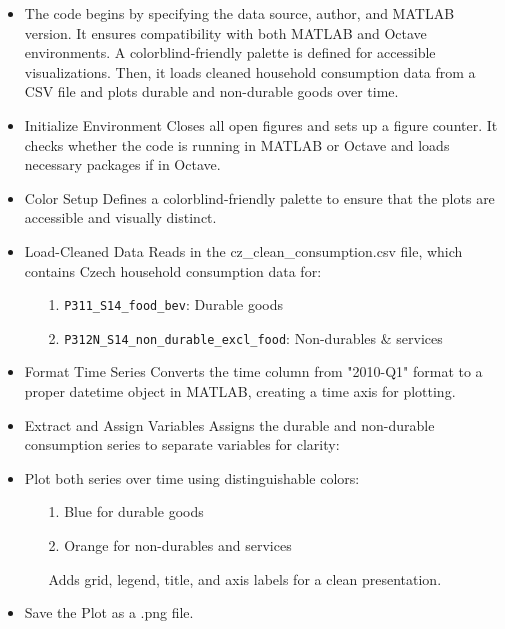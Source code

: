 \documentclass[12pt,a4paper,notitlepage]{article}
\numberwithin{equation}{section}
\begin{document}
\begin{itemize}
    \item The code begins by specifying the data source, author, and MATLAB version. It ensures compatibility with both MATLAB and Octave environments. A colorblind-friendly palette is defined for accessible visualizations. Then, it loads cleaned household consumption data from a CSV file and plots durable and non-durable goods over time.

    \item Initialize Environment Closes all open figures and sets up a figure counter. It checks whether the code is running in MATLAB or Octave and loads necessary packages if in Octave.
    \item Color Setup Defines a colorblind-friendly palette to ensure that the plots are accessible and visually distinct.
    \item Load-Cleaned Data Reads in the {cz\_clean\_consumption.csv} file, which contains Czech household consumption data for: 
	   \begin{itemize}
    \item[1.] \texttt{P311\_S14\_food\_bev}: Durable goods
    \item[2.] \texttt{P312N\_S14\_non\_durable\_excl\_food}: Non-durables \& services
\end{itemize}

    
	\item Format Time Series Converts the time column from "2010-Q1" format to a proper datetime object in MATLAB, creating a time axis for plotting. 
    \item Extract and Assign Variables Assigns the durable and non-durable consumption series to separate variables for clarity:
    \item Plot both series over time using distinguishable colors:
    \begin{itemize}
		\item[1.] Blue for durable goods
		\item[2.] Orange for non-durables and services
        
        Adds grid, legend, title, and axis labels for a clean presentation.
	    \end{itemize}
	\item Save the Plot	 as a .png file.
	\end{itemize}
    
\end{document}
